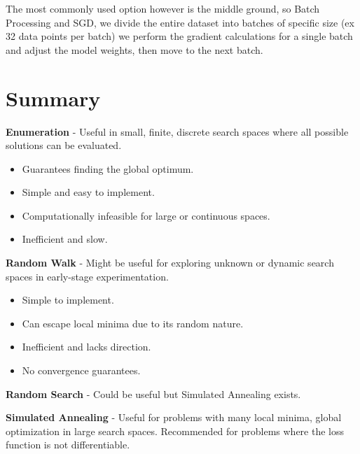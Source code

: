 \documentclass{article}
\begin{document}
    The most commonly used option however is the middle ground, so Batch Processing and SGD, we divide the entire dataset into batches of specific size (ex 32 data points per batch) we perform the gradient calculations for a single batch and adjust the model weights, then move to the next batch.

    \break


    \section{Summary}

    \textbf{Enumeration} - Useful in small, finite, discrete search spaces where all possible solutions can be evaluated.

    \begin{itemize}[label=]
        \item Guarantees finding the global optimum.
        \item Simple and easy to implement.
    \end{itemize}
    \begin{itemize}[label=]
        \item Computationally infeasible for large or continuous spaces.
        \item Inefficient and slow.
    \end{itemize}

    \textbf{Random Walk} - Might be useful for exploring unknown or dynamic search spaces in early-stage experimentation.

    \begin{itemize}[label=]
        \item Simple to implement.
        \item Can escape local minima due to its random nature.
    \end{itemize}
    \begin{itemize}[label=]
        \item Inefficient and lacks direction.
        \item No convergence guarantees.
    \end{itemize}

    \textbf{Random Search} - Could be useful but Simulated Annealing exists.\newline

    \textbf{Simulated Annealing} - Useful for problems with many local minima, global optimization in large search spaces.
    Recommended for problems where the loss function is not differentiable.
\end{document}

